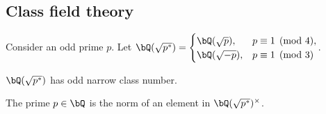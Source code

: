 \subsection{Class field theory}

Consider an odd prime $p$. Let $\bQ(\sqrt{p^*}) = \begin{cases} \bQ(\sqrt{p}), & p \equiv 1 \pmod 4,\\ \bQ(\sqrt{-p}), & p \equiv 1 \pmod 3  
\end{cases}$.

\begin{prop}
$\bQ(\sqrt{p^*})$ has odd narrow class number.
\end{prop}    

\begin{cor}\label{p-norm}
The prime $p \in \bQ$ is the norm of an element in $\bQ(\sqrt{p^*})^{\times}$.
\end{cor}